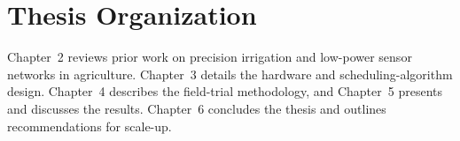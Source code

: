 \section{Thesis Organization}
Chapter~2 reviews prior work on precision irrigation and low-power sensor networks in
agriculture. Chapter~3 details the hardware and scheduling-algorithm design. Chapter~4
describes the field-trial methodology, and Chapter~5 presents and discusses the results.
Chapter~6 concludes the thesis and outlines recommendations for scale-up.

